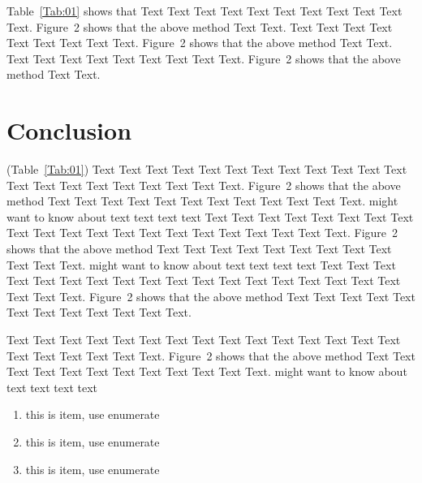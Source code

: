\documentclass{bioinfo}
\begin{document}
Table~\ref{Tab:01} shows that Text Text Text Text Text  Text Text
Text Text Text Text. Figure~2\vphantom{\ref{fig:02}} shows that
the above method Text Text. Text Text Text  Text Text Text Text
Text Text. Figure~2\vphantom{\ref{fig:02}} shows that the above
method Text Text. Text Text Text  Text Text Text Text Text Text.
Figure~2\vphantom{\ref{fig:02}} shows that the above method Text
Text.









%
%






\section{Conclusion}

(Table~\ref{Tab:01}) Text Text Text Text Text Text  Text Text Text
Text Text Text Text Text Text  Text Text Text Text Text Text.
Figure~2\vphantom{\ref{fig:02}} shows that the above method  Text
Text Text Text  Text Text Text Text Text Text  Text Text.
\citealp{Boffelli03} might want to know about  text text text text
Text Text Text Text Text Text  Text Text Text Text Text Text Text
Text Text  Text Text Text Text Text Text.
Figure~2\vphantom{\ref{fig:02}} shows that the above method  Text
Text Text Text  Text Text Text Text Text Text  Text Text.
\citealp{Boffelli03} might want to know about  text text text text
Text Text Text Text Text Text Text Text Text Text Text Text Text
Text Text  Text Text Text Text Text Text.
Figure~2\vphantom{\ref{fig:02}} shows that the above method  Text
Text Text Text  Text Text Text Text Text Text  Text Text.



Text Text Text Text Text Text  Text Text Text Text Text Text Text
Text Text  Text Text Text Text Text Text.
Figure~2\vphantom{\ref{fig:02}} shows that the above method  Text
Text Text Text  Text Text Text Text Text Text  Text Text.
\citealp{Boffelli03} might want to know about  text text text text

\begin{enumerate}
\item this is item, use enumerate
\item this is item, use enumerate
\item this is item, use enumerate
\end{enumerate}
\end{document}
